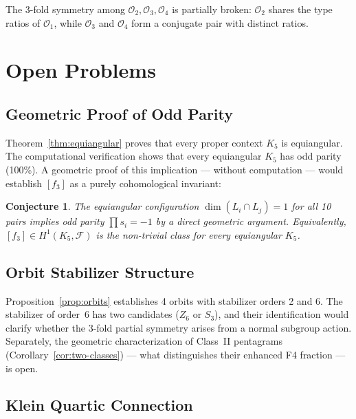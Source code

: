 \documentclass[11pt,a4paper]{article}
\newtheorem{conjecture}[theorem]{Conjecture}
\theoremstyle{remark}
\newcommand{\cF}{\mathcal{F}}
\begin{document}
The 3-fold symmetry among $\mathcal{O}_2, \mathcal{O}_3, \mathcal{O}_4$
is partially broken: $\mathcal{O}_2$ shares the type ratios of
$\mathcal{O}_1$, while $\mathcal{O}_3$ and $\mathcal{O}_4$ form a
conjugate pair with distinct ratios.

\section{Open Problems}
\label{sec:open-problems}

\subsection{Geometric Proof of Odd Parity}

Theorem~\ref{thm:equiangular} proves that every proper context $K_5$
is equiangular. The computational verification shows that every
equiangular $K_5$ has odd parity (100\%). A geometric proof of this
implication --- without computation --- would establish $[f_3]$ as a
purely cohomological invariant:

\begin{conjecture}
\label{conj:odd-parity}
The equiangular configuration $\dim(L_i \cap L_j) = 1$ for all 10 pairs
implies odd parity $\prod s_i = -1$ by a direct geometric argument.
Equivalently, $[f_3] \in H^1(K_5, \cF)$ is the non-trivial class for
every equiangular $K_5$.
\end{conjecture}

\subsection{Orbit Stabilizer Structure}

Proposition~\ref{prop:orbits} establishes 4 orbits with stabilizer
orders 2 and 6. The stabilizer of order~6 has two candidates ($Z_6$
or $S_3$), and their identification would clarify whether the 3-fold
partial symmetry arises from a normal subgroup action. Separately,
the geometric characterization of Class~II pentagrams
(Corollary~\ref{cor:two-classes}) --- what distinguishes their
enhanced F4 fraction --- is open.

\subsection{Klein Quartic Connection}
\end{document}
